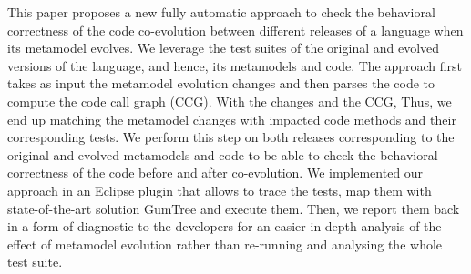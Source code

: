 

This paper proposes a new fully automatic approach to check the behavioral correctness of the code co-evolution between different releases of a language when its metamodel evolves. We leverage the test suites of the original and evolved versions of the language, and hence, its metamodels and code.  %
The approach first takes as input the metamodel evolution changes and then parses the code to compute the code call graph (CCG). With the changes and the CCG, 
Thus, we end up matching the metamodel changes with impacted code methods and their corresponding tests. We perform this step on both releases corresponding to the original and evolved metamodels and code to be able to check the behavioral correctness of the code before and after co-evolution.  
%
We implemented our approach in an Eclipse plugin that allows to trace the tests, map them with state-of-the-art solution GumTree \cite{falleri2014fine} and execute them. Then, we report them back in a form of diagnostic to the developers for an easier in-depth analysis of the effect of metamodel evolution rather than re-running and analysing the whole test suite.


